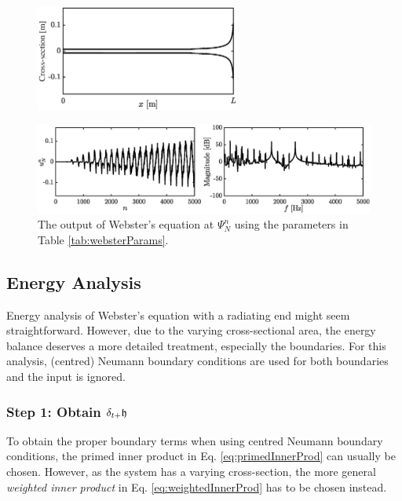 {\renewcommand{\arraystretch}{1}

\hspace{0.1\textwidth}
\begin{figure}[h]
    \centering
    \includegraphics[width=0.6\textwidth]{figures/resonators/brass/geometryWebster.eps}
\end{figure}

\begin{figure}[h]
    \centering
    \includegraphics[width=\textwidth]{figures/resonators/brass/outputWebster.eps}
    \caption{The output of Webster's equation at $\Psi_N^n$ using the parameters in Table \ref{tab:websterParams}. \label{fig:outputWebster}}
\end{figure}


\subsection{Energy Analysis}
Energy analysis of Webster's equation with a radiating end might seem straightforward. However, due to the varying cross-sectional area, the energy balance deserves a more detailed treatment, especially the boundaries. For this analysis, (centred) Neumann boundary conditions are used for both boundaries and the input is ignored.%

\subsubsection{Step 1: Obtain $\delta_{t+} \mathfrak{h}$}
To obtain the proper boundary terms when using centred Neumann boundary conditions, the primed inner product in Eq. \eqref{eq:primedInnerProd} can usually be chosen. However, as the system has a varying cross-section, the more general \textit{weighted inner product} in Eq. \eqref{eq:weightedInnerProd} has to be chosen instead.

}
